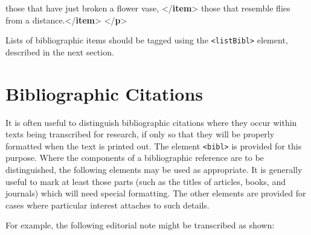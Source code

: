 \documentclass[11pt,twoside]{article}\makeatletter
\makeatletter
\renewcommand\section{\@startsection {section}{1}{\z@}%
     {-1.75ex \@plus -0.5ex \@minus -.2ex}%
     {0.5ex \@plus .2ex}%
     {\reset@font\Large\bfseries\sffamily}}
\def\DivI{\section}
\def\DivI{\chapter}
\makeatother
\begin{document}
\begin{shaded}
\hspace*{1em} those that have just broken a flower\mbox{}\newline 
\hspace*{1em}\hspace*{1em}\hspace*{1em}\hspace*{1em} vase, {</\textbf{item}>}\mbox{}\newline 
\hspace*{1em} those that resemble flies from a\mbox{}\newline 
\hspace*{1em}\hspace*{1em}\hspace*{1em}\hspace*{1em} distance.{</\textbf{item}>}\mbox{}\newline 
{}\mbox{}\newline 
{</\textbf{p}>}\end{shaded}\egroup\par \par Lists of bibliographic items should be tagged using the \texttt{<listBibl>}
element, described in the next section.
\DivI[Bibliographic Citations]{Bibliographic Citations}\label{U5-bibls}\par It is often useful to distinguish bibliographic citations where
they occur within texts being transcribed for research, if only so
that they will be properly formatted when the text is printed out. The
element \texttt{<bibl>} is provided for this purpose. 
Where the components of a bibliographic reference are to be
distinguished, the following elements may be used as appropriate. It
is generally useful to mark at least those parts (such as the titles
of articles, books, and journals) which will need special formatting. 
The other elements are provided for cases where particular interest
attaches to such details.
\par For example, the following editorial note might be transcribed as
shown:
\end{document}
